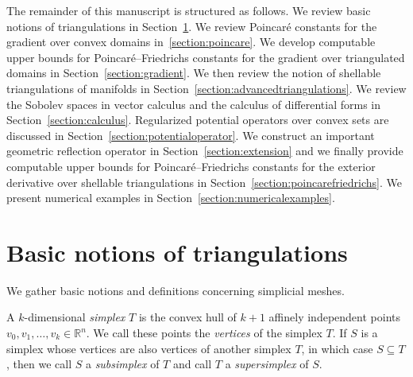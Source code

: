 \documentclass[10pt,letterpaper]{article}
\begin{document}
The remainder of this manuscript is structured as follows.
We review basic notions of triangulations in Section~\ref{section:triangulations}.
We review Poincar\'e constants for the gradient over convex domains in~\ref{section:poincare}.
We develop computable upper bounds for Poincar\'e--Friedrichs constants for the gradient over triangulated domains in Section~\ref{section:gradient}.
We then review the notion of shellable triangulations of manifolds in Section~\ref{section:advancedtriangulations}.
We review the Sobolev spaces in vector calculus and the calculus of differential forms in Section~\ref{section:calculus}.
Regularized potential operators over convex sets are discussed in Section~\ref{section:potentialoperator}.
We construct an important geometric reflection operator in Section~\ref{section:extension}
and we finally provide computable upper bounds for Poincar\'e--Friedrichs constants for the exterior derivative over shellable triangulations in Section~\ref{section:poincarefriedrichs}.
We present numerical examples in Section~\ref{section:numericalexamples}. 






































\section{Basic notions of triangulations}\label{section:triangulations}

We gather basic notions and definitions concerning simplicial meshes. 
  
A ${k}$-dimensional \emph{simplex} $T$ is the convex hull of ${k}+1$ affinely independent points $v_0, v_1, \ldots, v_{{k}} \in \mathbb{R}^{n}$. We call these points the \emph{vertices} of the simplex $T$. 
If $S$ is a simplex whose vertices are also vertices of another simplex $T$, in which case $S \subseteq T$, 
then we call $S$ a \textit{subsimplex} of $T$ and call $T$ a \textit{supersimplex} of $S$. 
\end{document}
